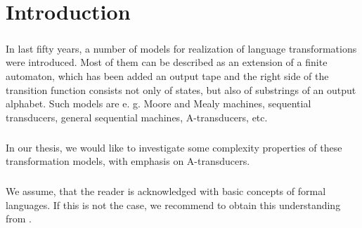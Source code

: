\chapter*{Introduction}
\paragraph{}
In last fifty years, a number of models for realization of language transformations were introduced. Most of them can be described as an extension of a finite automaton, which has been added an output tape and the right side of the transition function consists not only of states, but also of substrings of an output alphabet. Such models are e. g. Moore and Mealy machines, sequential transducers, general sequential machines, A-transducers, etc.

\paragraph{}
In our thesis, we would like to investigate some complexity properties of these transformation models, with emphasis on A-transducers. 

\paragraph{}
We assume, that the reader is acknowledged with basic concepts of formal languages. If this is not the case, we recommend to obtain this understanding from \cite{hopcroft:fola}.
